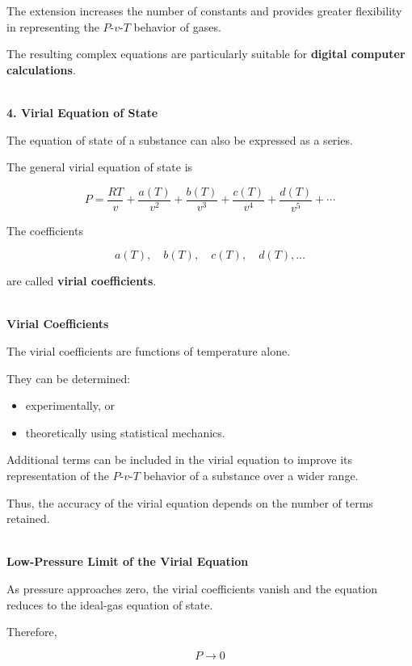 \documentclass[12pt]{article}
\begin{document}
The extension increases the number of constants and provides greater flexibility in representing the $P$-$v$-$T$ behavior of gases.

The resulting complex equations are particularly suitable for \textbf{digital computer calculations}.

\textbf{\\ 4. Virial Equation of State}

The equation of state of a substance can also be expressed as a series.

The general virial equation of state is

\begin{equation*}
\boxed{
P=
\frac{RT}{v}
+
\frac{a(T)}{v^2}
+
\frac{b(T)}{v^3}
+
\frac{c(T)}{v^4}
+
\frac{d(T)}{v^5}
+\cdots
}
\end{equation*}

The coefficients

\begin{equation*}
a(T),\quad b(T),\quad c(T),\quad d(T),\ldots
\end{equation*}

are called \textbf{virial coefficients}.

\textbf{\\ Virial Coefficients}

The virial coefficients are functions of temperature alone.

They can be determined:
\begin{itemize}
    \item experimentally, or
    \item theoretically using statistical mechanics.
\end{itemize}

Additional terms can be included in the virial equation to improve its representation of the $P$-$v$-$T$ behavior of a substance over a wider range.

Thus, the accuracy of the virial equation depends on the number of terms retained.

\textbf{\\ Low-Pressure Limit of the Virial Equation}

As pressure approaches zero, the virial coefficients vanish and the equation reduces to the ideal-gas equation of state.

Therefore,

\begin{equation*}
P\rightarrow0
\end{equation*}
\end{document}
